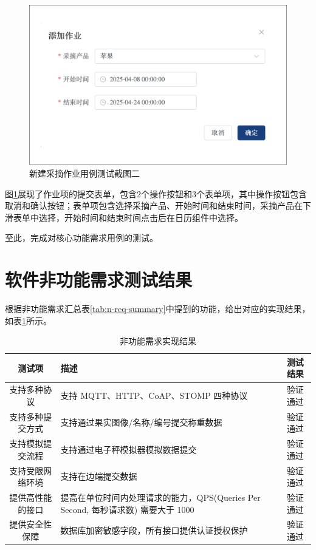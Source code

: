 \begin{figure}[H]
    \centering
    \includegraphics[width=0.8\linewidth]{../result/work-new-result-2.png}
    \caption{新建采摘作业用例测试截图二}
    \label{fig:work-new-result-2}
\end{figure}

图\ref{fig:work-new-result-2}展现了作业项的提交表单，包含2个操作按钮和3个表单项，其中操作按钮包含取消和确认按钮；表单项包含选择采摘产品、开始时间和结束时间，采摘产品在下滑表单中选择，开始时间和结束时间点击后在日历组件中选择。

至此，完成对核心功能需求用例的测试。

\section{软件非功能需求测试结果}

根据非功能需求汇总表\ref{tab:n-req-summary}中提到的功能，给出对应的实现结果，如表\ref{tab:test-n-req-summary}所示。

\begin{longtable}[ht]{|c|p{8cm}|c|}
\caption{非功能需求实现结果}
\label{tab:test-n-req-summary}
\\
\hline
测试项 & 描述 & 测试结果 \\\hline
支持多种协议 & 支持 MQTT、HTTP、CoAP、STOMP 四种协议 & 验证通过 \\\hline
支持多种提交方式 & 支持通过果实图像/名称/编号提交称重数据 & 验证通过 \\\hline
支持模拟提交流程 & 支持通过电子秤模拟器模拟数据提交 & 验证通过 \\\hline
支持受限网络环境 & 支持在边端提交数据 & 验证通过 \\\hline
提供高性能的接口 & 提高在单位时间内处理请求的能力，QPS(Queries Per Second, 每秒请求数) 需要大于 1000 & 验证通过 \\\hline
提供安全性保障 & 数据库加密敏感字段，所有接口提供认证授权保护 & 验证通过 \\\hline
\end{longtable}

